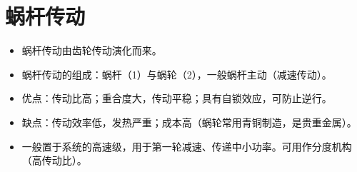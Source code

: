 \documentclass[12pt,a4paper]{article}
\newcommand{\tightlist}{\setlength{\parskip}{0pt}\setlength{\itemsep}{0pt}}
\newcommand{\hint}[1]{\textsf{（#1）}}
\begin{document}
\section{蜗杆传动}
\begin{itemize}\tightlist
    \item 蜗杆传动由齿轮传动演化而来。
    \item 蜗杆传动的组成：蜗杆（1）与蜗轮（2），一般蜗杆主动\hint{减速传动}。
    \item 优点：传动比高；重合度大，传动平稳；具有自锁效应，可防止逆行。
    \item 缺点：传动效率低，发热严重；成本高\hint{蜗轮常用青铜制造，是贵重金属}。
    \item 一般置于系统的高速级，用于第一轮减速、传递中小功率。可用作分度机构
    \hint{高传动比}。
\end{itemize}
\end{document}
